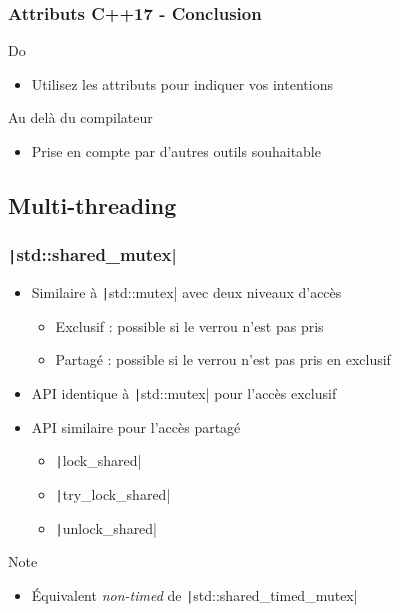 \documentclass[C++.tex]{subfiles}
\begin{document}
\begin{frame}[fragile]
	\frametitle{Attributs C++17 - Conclusion}
	\begin{exampleblock}{Do}
		\begin{itemize}
			\item Utilisez les attributs pour indiquer vos intentions
		\end{itemize}

	\end{exampleblock}

	\begin{block}{Au delà du compilateur}
		\begin{itemize}
			\item Prise en compte par d'autres outils souhaitable
		\end{itemize}
	\end{block}
\end{frame}

\subsection*{Multi-threading}
\begin{frame}[fragile]
	\frametitle{\texttt|std::shared_mutex|}
	\begin{itemize}
		\item Similaire à \texttt|std::mutex| avec deux niveaux d'accès
		\begin{itemize}
			\item Exclusif : possible si le verrou n'est pas pris
			\item Partagé : possible si le verrou n'est pas pris en exclusif
		\end{itemize}
		\item API identique à \texttt|std::mutex| pour l'accès exclusif
		\item API similaire pour l'accès partagé
		\begin{itemize}
			\item \texttt|lock_shared|
			\item \texttt|try_lock_shared|
			\item \texttt|unlock_shared|
		\end{itemize}
	\end{itemize}

	\begin{block}{Note}
		\begin{itemize}
			\item Équivalent \textit{non-timed} de \texttt|std::shared_timed_mutex|
		\end{itemize}
	\end{block}

\end{frame}
\end{document}

